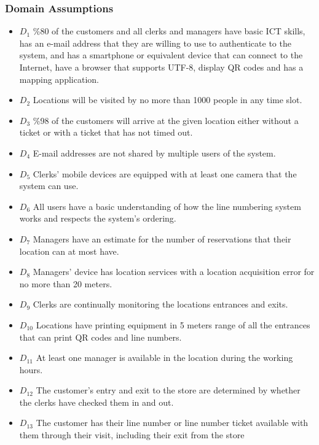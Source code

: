 \subsubsection{Domain Assumptions}

\begin{itemize}
    \item \textbf{$D_1$} \%80 of the customers and all clerks and managers have basic ICT skills, has an e-mail address that they are willing to use to authenticate to the system, and has a smartphone or equivalent device that can connect to the Internet, have a browser that supports UTF-8, display QR codes and has a mapping application.
    \item \textbf{$D_2$} Locations will be visited by no more than 1000 people in any time slot.
    \item \textbf{$D_3$} \%98 of the customers will arrive at the given location either without a ticket or with a ticket that has not timed out.
    \item \textbf{$D_4$} E-mail addresses are not shared by multiple users of the system.
    \item \textbf{$D_5$} Clerks' mobile devices are equipped with at least one camera that the system can use.
    \item \textbf{$D_6$} All users have a basic understanding of how the line numbering system works and respects the system's ordering.
    \item \textbf{$D_7$} Managers have an estimate for the number of reservations that their location can at most have.
    \item \textbf{$D_8$} Managers' device has location services with a location acquisition error for no more than 20 meters.
    \item \textbf{$D_9$} Clerks are continually monitoring the locations entrances and exits.
    \item \textbf{$D_{10}$} Locations have printing equipment in 5 meters range of all the entrances that can print QR codes and line numbers.
    \item \textbf{$D_{11}$} At least one manager is available in the location during the working hours.
    \item \textbf{$D_{12}$} The customer's entry and exit to the store are determined by whether the clerks have checked them in and out.
    \item \textbf{$D_{13}$} The customer has their line number or line number ticket available with them through their visit, including their exit from the store
\end{itemize}

